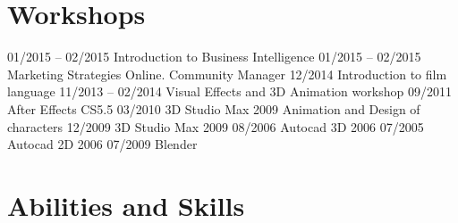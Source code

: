 \documentclass[11pt,a4paper,roman]{moderncv}
\begin{document}
\section{Workshops} 
 			{01/2015 -- 02/2015 Introduction to Business Intelligence}
\cvline{} 					{01/2015 -- 02/2015 Marketing Strategies Online. Community Manager}
\cvline{} 					{12/2014 \hspace{17mm} Introduction to film language}
	{11/2013 -- 02/2014 Visual Effects and 3D Animation workshop}
		{09/2011 \hspace{15mm} After Effects CS5.5}
\cvline{}					{03/2010 \hspace{15mm} 3D Studio Max 2009 Animation and Design of characters}
\cvline{}					{12/2009 \hspace{15mm} 3D Studio Max 2009}
\cvline{}					{08/2006 \hspace{15mm} Autocad 3D 2006}
\cvline{}					{07/2005 \hspace{15mm} Autocad 2D 2006}
				{07/2009 \hspace{15mm} Blender}

\section{Abilities and Skills} 



% 

\newpage
\end{document}

